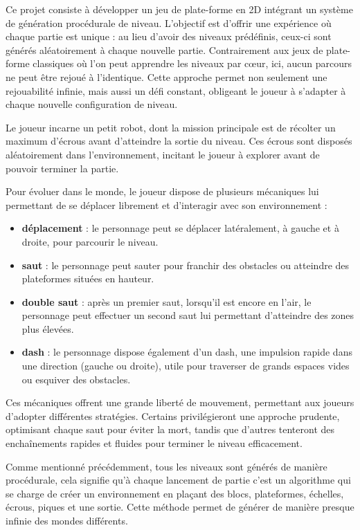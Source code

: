 \documentclass[10pt]{report}
\begin{document}
Ce projet consiste à développer un jeu de plate-forme en 2D intégrant un système de génération procédurale de niveau.
L’objectif est d’offrir une expérience où chaque partie est unique : au lieu d’avoir des niveaux prédéfinis,
ceux-ci sont générés aléatoirement à chaque nouvelle partie.
Contrairement aux jeux de plate-forme classiques où l'on peut apprendre les niveaux par cœur, ici, aucun parcours ne
peut être rejoué à l’identique.
Cette approche permet non seulement une rejouabilité infinie, mais aussi un défi constant, obligeant le joueur
à s’adapter à chaque nouvelle configuration de niveau.

Le joueur incarne un petit robot, dont la mission principale est de récolter un maximum d’écrous
avant d’atteindre la sortie du niveau.
Ces écrous sont disposés aléatoirement dans l’environnement, incitant le joueur à explorer avant de pouvoir
terminer la partie.

Pour évoluer dans le monde, le joueur dispose de plusieurs mécaniques lui permettant de se déplacer librement et
d’interagir avec son environnement :
\begin{itemize}
  \item \textbf{déplacement} : le personnage peut se déplacer latéralement, à gauche et à droite,
  pour parcourir le niveau.
  \item \textbf{saut} : le personnage peut sauter pour franchir des obstacles ou atteindre des plateformes
  situées en hauteur.
  \item \textbf{double saut} : après un premier saut, lorsqu'il est encore en l’air, le personnage peut effectuer
  un second saut lui permettant d’atteindre des zones plus élevées.
  \item \textbf{dash} : le personnage dispose également d’un dash, une impulsion rapide dans une direction
  (gauche ou droite), utile pour traverser de grands espaces vides ou esquiver des obstacles.\\
\end{itemize}

Ces mécaniques offrent une grande liberté de mouvement, permettant aux joueurs d’adopter différentes stratégies.
Certains privilégieront une approche prudente, optimisant chaque saut pour éviter la mort, tandis que d’autres
tenteront des enchaînements rapides et fluides pour terminer le niveau efficacement.


Comme mentionné précédemment, tous les niveaux sont générés de manière procédurale, cela signifie qu'à chaque
lancement de partie c'est un algorithme qui se charge de créer un environnement en plaçant des blocs, plateformes,
échelles, écrous, piques et une sortie.
Cette méthode permet de générer de manière presque infinie des mondes différents.
\end{document}
